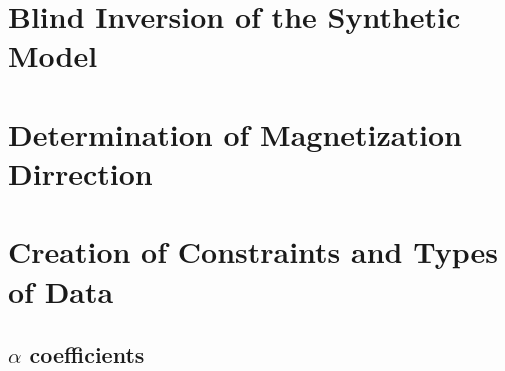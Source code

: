 \FloatBarrier
\section{Blind Inversion of the Synthetic Model}
\label{sec:Blind Inversion of the Synthetic Model:TKC}


\section{Determination of Magnetization Dirrection}
\label{sec:Determination of Magnetization Dirrection}
%
%
%
%
%

\section{Creation of Constraints and Types of Data}
\label{sec:Creation of Constraints:TKC}




\subsection{$\alpha$ coefficients}
\label{sec:alpha coefficients:TKC}


